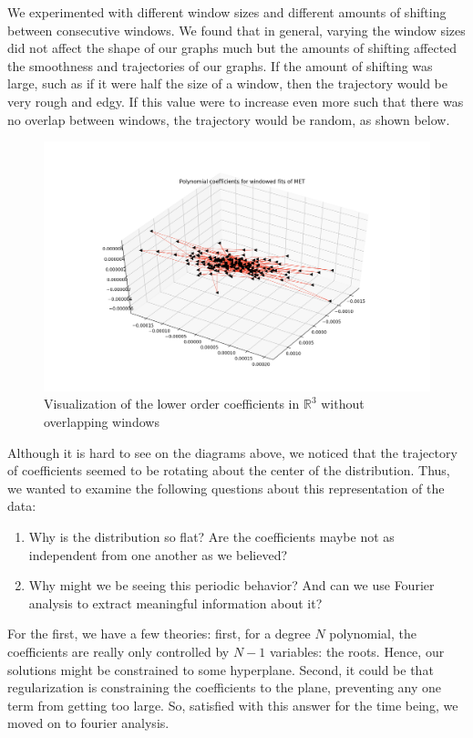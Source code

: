 \documentclass[final]{article}
\begin{document}
We experimented with different window sizes and different amounts of
shifting between consecutive windows. We found that in general,
varying the window sizes did not affect the shape of our graphs much
but the amounts of shifting affected the smoothness and trajectories
of our graphs. If the amount of shifting was large, such as if it were
half the size of a window, then the trajectory would be very rough and
edgy. If this value were to increase even more such that there was no
overlap between windows, the trajectory would be random, as shown
below.

\begin{figure}[H]
  \centering
  \includegraphics[width=\linewidth]{img/coeff3}
  \caption{Visualization of the lower order coefficients in $\mathbb{R}^3$
  without overlapping windows}
  \label{fig:coeff}
\end{figure}

Although it is hard to see on the diagrams above, we noticed that the
trajectory of coefficients seemed to be rotating about the center of
the distribution. Thus, we wanted to examine the following questions
about this representation of the data:
\begin{enumerate}
  \item Why is the distribution so flat? Are the coefficients maybe
    not as independent from one another as we believed?
  \item Why might we be seeing this periodic behavior? And can we use
    Fourier analysis to extract meaningful information about it?
\end{enumerate}
For the first, we have a few theories: first, for a degree $N$
polynomial, the coefficients are really only controlled by $N-1$
variables: the roots. Hence, our solutions might be constrained to
some hyperplane. Second, it could be that regularization is
constraining the coefficients to the plane, preventing any one term
from getting too large. So, satisfied with this answer for the time
being, we moved on to fourier analysis.
\end{document}
